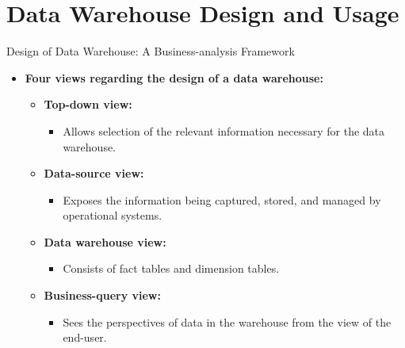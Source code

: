 \section{Data Warehouse Design and Usage}

\begin{frame}{Design of Data Warehouse: A Business-analysis Framework}
	\begin{itemize}
		\item \textbf{Four views regarding the design of a data warehouse:}
		      \begin{itemize}
			      \item \textbf{\color{airforceblue}Top-down view:}
			            \begin{itemize}
				            \item Allows selection of the relevant information necessary for the data warehouse.
			            \end{itemize}
			      \item \textbf{\color{airforceblue}Data-source view:}
			            \begin{itemize}
				            \item Exposes the information being captured, stored, and managed by operational systems.
			            \end{itemize}
			      \item \textbf{\color{airforceblue}Data warehouse view:}
			            \begin{itemize}
				            \item Consists of fact tables and dimension tables.
			            \end{itemize}
			      \item \textbf{\color{airforceblue}Business-query view:}
			            \begin{itemize}
				            \item Sees the perspectives of data in the warehouse from the view of the end-user.
			            \end{itemize}
		      \end{itemize}
	\end{itemize}
\end{frame}

